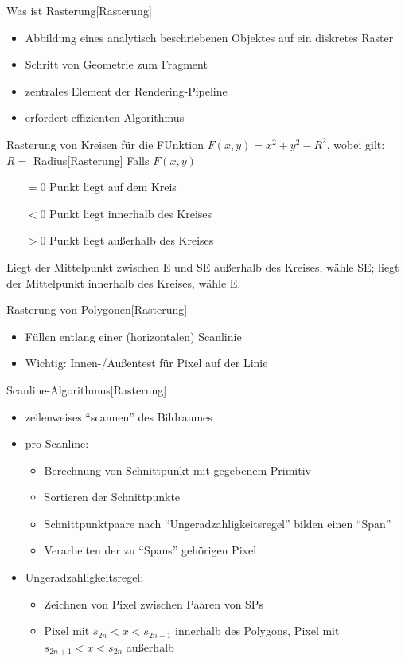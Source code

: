 \documentclass[a7paper,print]{kartei}
\begin{document}
\begin{karte}[CGIS]{Was ist Rasterung}[Rasterung]
\begin{itemize}
\item Abbildung eines analytisch beschriebenen Objektes auf ein diskretes Raster
\item Schritt von Geometrie zum Fragment
\item zentrales Element der Rendering-Pipeline
\item erfordert effizienten Algorithmus
\end{itemize}
\end{karte}

\begin{karte}[CGIS]{Rasterung von Kreisen für die FUnktion $F(x,y) = x^2 + y^2 - R^2$, wobei gilt: $R=$ Radius}[Rasterung]
Falls $F(x,y)$
\begin{itemize}
\item [$=0$] Punkt liegt auf dem Kreis
\item [$<0$] Punkt liegt innerhalb des Kreises
\item [$>0$] Punkt liegt außerhalb des Kreises
\end{itemize}
Liegt der Mittelpunkt zwischen E und SE außerhalb des Kreises, wähle SE; liegt der Mittelpunkt innerhalb des Kreises, wähle E.
\end{karte}

\begin{karte}[CGIS]{Rasterung von Polygonen}[Rasterung]
\begin{itemize}
\item Füllen entlang einer (horizontalen) Scanlinie
\item Wichtig: Innen-/Außentest für Pixel auf der Linie
\end{itemize}
\end{karte}

\begin{karte}[CGIS]{Scanline-Algorithmus}[Rasterung]
\begin{itemize}
\item zeilenweises "`scannen"' des Bildraumes
\item pro Scanline:
	\begin{itemize}
	\item Berechnung von Schnittpunkt mit gegebenem Primitiv
	\item Sortieren der Schnittpunkte
	\item Schnittpunktpaare nach "`Ungeradzahligkeitsregel"' bilden einen "`Span"'
	\item Verarbeiten der zu "`Spans"' gehörigen Pixel
	\end{itemize}
\item Ungeradzahligkeitsregel:
	\begin{itemize}
	\item Zeichnen von Pixel zwischen Paaren von SPs
	\item Pixel mit $s_{2n} < x < s_{2n +1}$ innerhalb des Polygons, Pixel mit $s_{2n+1} < x < s_{2n}$ außerhalb
	\end{itemize}
\end{itemize}
\end{karte}
\end{document}
